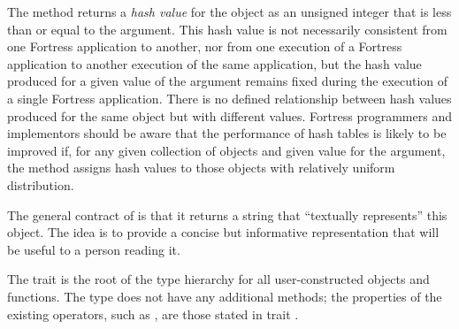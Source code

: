 The  method returns a \emph{hash value} for the object as an
unsigned integer that is less than or equal to the  argument.
This hash value is not necessarily consistent from one Fortress
application to another, nor from one execution of a Fortress
application to another execution of the same application, but the hash
value produced for a given value of the  argument remains
fixed during the execution of a single Fortress application.  There is
no defined relationship between hash values produced for the same
object but with different  values.  Fortress programmers and
implementors should be aware that the performance of hash tables is
likely to be improved if, for any given collection of objects and
given value for the  argument, the  method
assigns hash values to those objects with relatively uniform distribution.



The general contract of  is that it returns a string that
``textually represents'' this object. The idea is to provide a concise but
informative representation that will be useful to a person reading it.



The trait  is the root of the type hierarchy for all
user-constructed objects and functions.
The  type does not
have any additional methods;
the properties of the existing operators, such as \EXP{\sequiv},
are those stated in trait .

